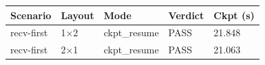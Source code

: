 \begin{tabular}{lllll}
\toprule
Scenario & Layout & Mode & Verdict & Ckpt (s) \\
\midrule
recv-first & 1$\times$2 & ckpt\_resume & PASS & 21.848 \\
recv-first & 2$\times$1 & ckpt\_resume & PASS & 21.063 \\
\bottomrule
\end{tabular}
